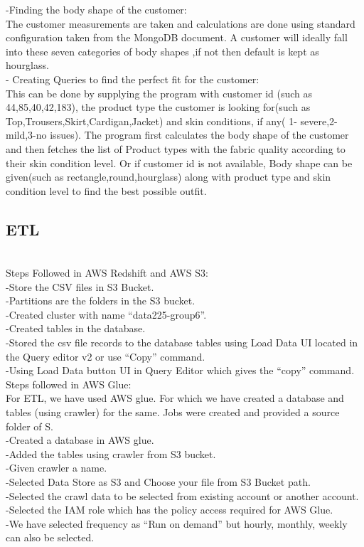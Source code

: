 \documentclass[11pt,journal,compsoc]{IEEEtran}
\begin{document}
-Finding the body shape of the customer: \\ 
The customer measurements are taken and calculations are done using standard configuration taken from the MongoDB document. A customer will ideally fall into these seven categories of body shapes ,if not then default is kept as hourglass. \\

- Creating Queries to find the perfect fit for the customer: \\
This can be done by supplying the program with customer id (such as  44,85,40,42,183), the product type the customer is looking for(such as Top,Trousers,Skirt,Cardigan,Jacket) and skin conditions, if any( 1- severe,2-mild,3-no issues). The program first calculates the body shape of the customer and then fetches the list of Product types with the fabric quality according to their skin condition level.
Or if customer id is not available, Body shape can be given(such as rectangle,round,hourglass) along with product type and skin condition level to find the best possible outfit. \\


\subsection{ETL} \\
Steps Followed in AWS Redshift and AWS S3: \\
-Store the CSV files in S3 Bucket. \\
-Partitions are the folders in the S3 bucket. \\
-Created cluster with name “data225-group6”. \\
-Created tables in the database. \\
-Stored the csv file records to the database tables using Load Data UI located in the Query editor v2 or use “Copy” command.  \\
-Using Load Data button UI in Query Editor which gives the “copy” command.\\

Steps followed in AWS Glue: \\
For ETL, we have used AWS glue. For which we have created a database and tables (using crawler) for the same. Jobs were created and provided a source folder of S. \\
-Created a database in AWS glue. \\
-Added the tables using crawler from S3 bucket. \\
-Given crawler a name. \\
-Selected Data Store as S3 and Choose your file from S3 Bucket path. \\
-Selected the crawl data to be selected from existing account or another account. \\
-Selected the IAM role which has the policy access required for AWS Glue. \\
-We have selected frequency as “Run on demand” but hourly, monthly, weekly can also be selected. \\
\end{document}
